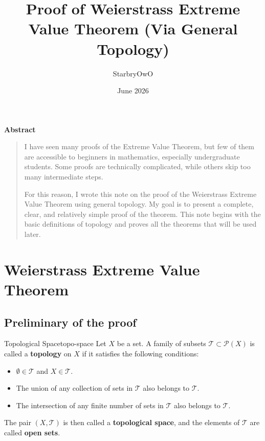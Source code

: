 \documentclass[UTF8,12pt,a4paper]{ctexart}
\title{\textbf{Proof of Weierstrass Extreme Value Theorem (Via General Topology)}}
\author{StarbryOwO}
\date{June 2026}
\numberwithin{equation}{section}
\newenvironment{myabstract}{
  \begin{center}
    {\Large\bfseries Abstract\par}
    \vspace{0.8em}
  \end{center}
  \begin{quote}
  \normalsize
}{
  \end{quote}
  \vspace{1em}
}
\begin{document}
\maketitle

\begin{myabstract}
  I have seen many proofs of the Extreme Value Theorem, but few of them are accessible to beginners in mathematics, especially undergraduate students. Some proofs are technically complicated, while others skip too many intermediate steps.

For this reason, I wrote this note on the proof of the Weierstrass Extreme Value Theorem using general topology. My goal is to present a complete, clear, and relatively simple proof of the theorem. This note begins with the basic definitions of topology and proves all the theorems that will be used later.

\end{myabstract}

\tableofcontents
\newpage


\section{Weierstrass Extreme Value Theorem}
\subsection{Preliminary of the proof}

\begin{defi}{Topological Space}{topo-space}
Let $X$ be a set. A family of subsets $\mathcal{T} \subset \mathcal{P}(X)$ is called a \textbf{topology} on $X$ if it satisfies the following conditions:
\begin{itemize}
  \item $\emptyset \in \mathcal{T}$ and $X \in \mathcal{T}$.
  \item The union of any collection of sets in $\mathcal{T}$ also belongs to $\mathcal{T}$.
  \item The intersection of any finite number of sets in $\mathcal{T}$ also belongs to $\mathcal{T}$.
\end{itemize}
The pair $(X, \mathcal{T})$ is then called a \textbf{topological space}, and the elements of $\mathcal{T}$ are called \textbf{open sets}.
\end{defi}
\end{document}
